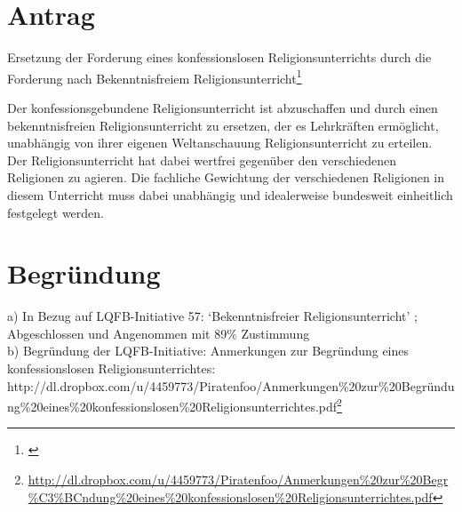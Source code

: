 \section{Antrag}

Ersetzung der Forderung eines konfessionslosen Religionsunterrichts durch die Forderung nach Bekenntnisfreiem Religionsunterricht\footnote{\url{}}

Der konfessionsgebundene Religionsunterricht ist abzuschaffen und durch einen bekenntnisfreien Religionsunterricht zu ersetzen, der es Lehrkräften ermöglicht, unabhängig von ihrer eigenen Weltanschauung Religionsunterricht zu erteilen. Der Religionsunterricht hat dabei wertfrei gegenüber den verschiedenen Religionen zu agieren. Die fachliche Gewichtung der verschiedenen Religionen in diesem Unterricht muss dabei unabhängig und idealerweise bundesweit einheitlich festgelegt werden.

\section{Begründung}

a) In Bezug auf LQFB-Initiative 57: `Bekenntnisfreier Religionsunterricht' ; Abgeschlossen und Angenommen mit 89\% Zustimmung\\b) Begründung der LQFB-Initiative: Anmerkungen zur Begründung eines konfessionslosen Religionsunterrichtes: http://dl.dropbox.com/u/4459773/Piratenfoo/Anmerkungen\%20zur\%20Begründung\%20eines\%20konfessionslosen\%20Religionsunterrichtes.pdf\footnote{\url{http://dl.dropbox.com/u/4459773/Piratenfoo/Anmerkungen\%20zur\%20Begr\%C3\%BCndung\%20eines\%20konfessionslosen\%20Religionsunterrichtes.pdf}}
